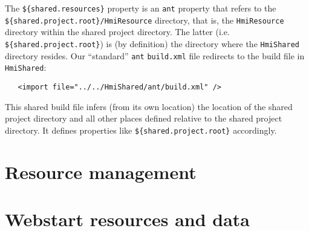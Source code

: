 The \verb#${shared.resources}# property is an \verb#ant# property that refers to the\\ \verb#${shared.project.root}/HmiResource# directory, that is, the \verb#HmiResource# directory within the shared project directory.
The latter (i.e. \verb#${shared.project.root}#)  is (by definition) the directory where the \verb#HmiShared# directory resides.
Our ``standard'' \verb#ant# \verb#build.xml# file redirects to the build file in \verb#HmiShared#:
\begin{verbatim}
   <import file="../../HmiShared/ant/build.xml" />
\end{verbatim}
This shared build file infers (from its own location) the location of the shared project directory and all other places defined relative to the shared project directory.  It defines properties like  \verb#${shared.project.root}# accordingly.


\label{shared-resources}

\section{Resource management}
\label{resource-management}

\section{Webstart resources and data}
\label{webstart-resources} 